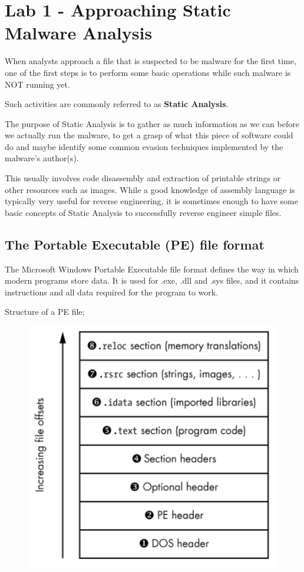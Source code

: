 \documentclass[]{project_plan}
\begin{document}
\chapter{Lab 1 - Approaching Static Malware Analysis}

When analysts approach a file that is suspected to be malware for the first time,
one of the first steps is to perform some basic operations while such malware is
NOT running yet.

Such activities are commonly referred to as \textbf{Static Analysis}.

The purpose of Static Analysis is to gather as much information as we can
before we actually run the malware, to get a grasp of what this piece of software
could do and maybe identify some common evasion techniques implemented by
the malware’s author(s).

This usually involves code disassembly and extraction
of printable strings or other resources such as images. While a good knowledge
of assembly language is typically very useful for reverse engineering, it is
sometimes enough to have some basic concepts of Static Analysis to successfully
reverse engineer simple files.

\section{The Portable Executable (PE) file format}

The Microsoft Windows Portable Executable file format defines the way in which
modern programs store data. It is used for .exe, .dll and .sys files, and it
contains instructions and all data required for the program to work.

Structure of a PE file;
\begin{figure}[H]
  \centering
  \includegraphics*[width=.5\linewidth]{pe_file_structure.png}
\end{figure}
\end{document}
